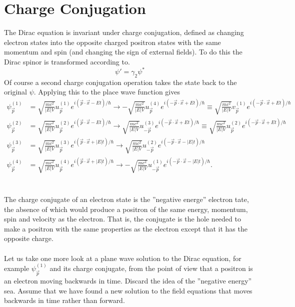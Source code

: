 \documentclass{report}
\begin{document}
\section{Charge Conjugation}
The Dirac equation is invariant under charge conjugation, defined as changing electron states into the opposite charged positron states with the same momentum and spin (and changing the sign of external fields). To do this the Dirac spinor is transformed according to.
\begin{equation}
	\psi' = \gamma_2 \psi^{*}
\end{equation}
Of course a second charge conjugation operation takes the state back to the original $\displaystyle \psi$. Applying this to the place wave function gives
\begin{align*}
	\psi^{(1)}_{\vec{p}} & = \sqrt{\frac{mc^2}{\left| E \right| V}} u^{(1)}_{\vec{p}} e^{i \left( \vec{p} \cdot \vec{x} - Et \right) / \hbar} \to -\sqrt{\frac{mc^2}{\left| E \right| V}} u^{(4)}_{\vec{p}} e ^{i \left( -\vec{p} \cdot \vec{x} + Et \right) / \hbar} \equiv \sqrt{\frac{mc^2}{\left| E \right| V}} v^{(1)}_{\vec{p}} e^{i \left( -\vec{p} \cdot \vec{x} + Et \right) / \hbar} \\
	\psi^{(2)}_{\vec{p}} & = \sqrt{\frac{mc^2}{\left| E \right| V}} u^{(2)}_{\vec{p}} e^{i \left( \vec{p} \cdot \vec{x} - Et \right) / \hbar} \to \sqrt{\frac{mc^2}{\left| E \right| V}} u^{(3)}_{-\vec{p}} e^{i \left( -\vec{p} \cdot \vec{x} + Et \right) / \hbar} \equiv \sqrt{\frac{mc^2}{\left| E \right| V}} u^{(2)}_{\vec{p}} e^{i \left( -\vec{p} \cdot \vec{x} + Et \right) / \hbar}  \\
	\psi^{(3)}_{\vec{p}} & = \sqrt{\frac{mc^2}{\left| E \right| V}} u^{(3)}_{\vec{p}} e^{i \left( \vec{p} \cdot \vec{x} + \left| E \right| t \right) / \hbar} \to \sqrt{\frac{mc^2}{\left| E \right| V}} u^{(2)}_{-\vec{p}} e^{i \left( -\vec{p} \cdot \vec{x} - \left| E \right| t \right) / \hbar }                                                                                          \\
	\psi^{(4)}_{\vec{p}} & = \sqrt{\frac{mc^2}{\left| E \right| V}}  u^{(4)}_{\vec{p}} e^{i \left( \vec{p} \cdot \vec{x} + \left| E \right| t \right) / \hbar } \to -\sqrt{\frac{mc^2}{\left| E \right| V}} u^{(1)}_{-\vec{p}} e^{i \left( -\vec{p} \cdot \vec{x} - \left| E \right| t \right) / \hbar}
	.\end{align*}
\\
\\
The charge conjugate of an electron state is the ''negative energe'' electron tate, the absence of which would produce a positron of the same energy, momentum, spin and velocity as the electron. That is, the conjugate is the hole needed to make a positron with the same properties as the electron except that it has the opposite charge.
\\
\\
Let us take one more look at a plane wave solution to the Dirac equation, for example $\displaystyle \psi^{\left( 1 \right)}_{\vec{p}}$ and its charge conjugate, from the point of view that a positron is an electron moving backwards in time. Discard the idea of the ''negative energy'' sea. Assume that we have found a new solution to the field equations that moves backwards in time rather than forward.
\end{document}
